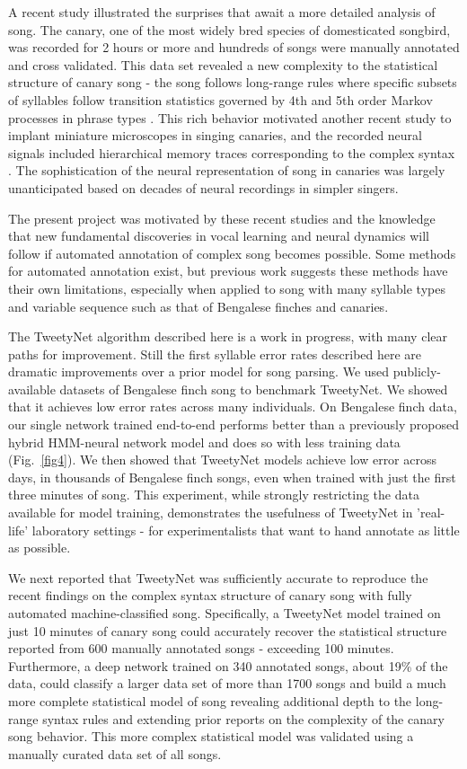 \documentclass[10pt,letterpaper]{article}
\begin{document}
A recent study illustrated the surprises that await a more detailed analysis of song. The canary, one of the most widely bred species of domesticated songbird, was recorded for 2 hours or more and hundreds of songs were manually annotated and cross validated. This data set revealed a new complexity to the statistical structure of canary song - the song follows long-range rules where specific subsets of syllables follow transition statistics governed by 4th and 5th order Markov processes in phrase types \cite{markowitz_long-range_2013}. This rich behavior motivated another recent study to implant miniature microscopes in singing canaries, and the recorded neural signals included hierarchical memory traces corresponding to the complex syntax \cite{cohen_hidden_2020}. The sophistication of the neural representation of song in canaries was largely unanticipated based on decades of neural recordings in simpler singers.

The present project was motivated by these recent studies and the knowledge that new fundamental discoveries in vocal learning and neural dynamics will follow if automated annotation of complex song becomes possible. Some methods for automated annotation exist, but previous work suggests these methods have their own limitations, especially when applied to song with many syllable types and variable sequence such as that of Bengalese finches and canaries. 

The TweetyNet algorithm described here is a work in progress, with many clear paths for improvement. Still the first syllable error rates described here are dramatic improvements over a prior model for song parsing. We used publicly-available datasets of Bengalese finch song to benchmark TweetyNet. We showed that it achieves low error rates across many individuals. On Bengalese finch data, our single network trained end-to-end performs better than a previously proposed hybrid HMM-neural network model and does so with less training data (Fig.~\ref{fig4}). We then showed that TweetyNet models achieve low error across days, in thousands of Bengalese finch songs, even when trained with just the first three minutes of song. This experiment, while strongly restricting the data available for model training, demonstrates the usefulness of TweetyNet in 'real-life' laboratory settings - for experimentalists that want to hand annotate as little as possible. 


We next reported that TweetyNet was sufficiently accurate to reproduce the recent findings on the complex syntax structure of canary song with fully automated machine-classified song.  Specifically, a TweetyNet model trained on just 10 minutes of canary song could accurately recover the statistical structure reported from 600 manually annotated songs - exceeding 100 minutes. Furthermore, a deep network trained on 340 annotated songs, about 19\% of the data, could classify a larger data set of more than 1700 songs and build a much more complete statistical model of song revealing additional depth to the long-range syntax rules and extending prior reports on the complexity of the canary song behavior. This more complex statistical model was validated using a manually curated data set of all songs.
\end{document}

